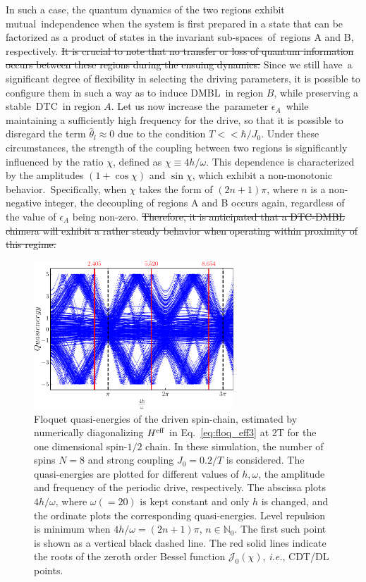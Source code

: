 \documentclass[
nofootinbib,
reprint,
superscriptaddress,
amsmath,amssymb,showkeys,
aps,
prb,
]{revtex4-2}
\begin{document}
	In such a case, the quantum dynamics of the two regions exhibit mutual independence when the system is first prepared in a state that can be factorized as a product of states in the invariant sub-spaces of regions A and B, respectively. \sout{It is crucial to note that no transfer or loss of quantum information occurs between these regions during the ensuing dynamics.}  Since we still have a significant degree of flexibility in selecting the driving parameters, it is possible to configure them in such a way as to induce DMBL in region $B$, while preserving a stable DTC in region $A$. Let us now increase the parameter $\epsilon_A$ while maintaining a sufficiently high frequency for the drive, so that it is possible to disregard the term $\hat{\theta}_l \approx 0$ due to the condition $T<<\hbar/J_0$. Under these circumstances, the strength of the coupling between two regions is significantly influenced by the ratio $\chi$, defined as $\chi\equiv 4h/\omega$. This dependence is characterized by the amplitudes $(1+\cos{\chi})$ and $\sin{\chi}$, which exhibit a non-monotonic behavior. Specifically, when $\chi$ takes the form of $(2n+1)\pi$, where $n$ is a non-negative integer, the decoupling of regions A and B occurs again, regardless of the value of $\epsilon_A$ being non-zero. \sout{Therefore, it is anticipated that a DTC-DMBL chimera will exhibit a rather steady behavior when operating within proximity of this regime.} 	
	\begin{figure}[h!]
		\centering
		\includegraphics[width=7.5cm]{quasienergy_8_lowres.pdf}
		\caption{Floquet quasi-energies of the driven spin-chain,  estimated by numerically diagonalizing $H^{\rm eff}$ in Eq.~\eqref{eq:floq_eff3} at 2T for the one dimensional spin-$1/2$ chain. In these simulation, the number of spins $N=8$ and strong coupling $J_0=0.2/T$ is considered. The quasi-energies are plotted for different values of $h,\omega$, the amplitude and frequency of the periodic drive, respectively.  The abscissa plots ${4h}/{\omega}$, where $\omega( = 20)$ is kept constant and only $h$ is changed, and the ordinate plots the corresponding quasi-energies. Level repulsion is minimum when ${4h}/{\omega} = (2n+1)\pi$, $n\in \mathbb{N}_0$. The first such point is shown as a vertical black dashed line. The red solid lines indicate the roots of the zeroth order Bessel function $\mathcal{J}_0(\chi)$, \textit{i.e.}, CDT/DL points.}
		\label{Fig:quasienergy_new}
	\end{figure}	
\end{document}
